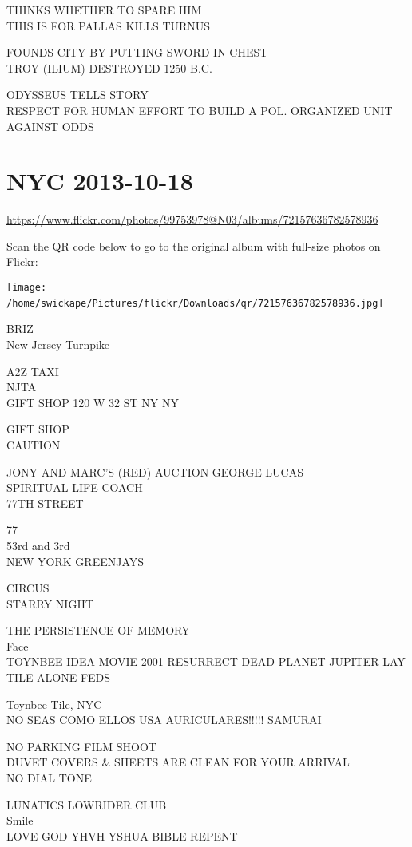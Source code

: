 \documentclass[10pt,letterpaper]{article}
\begin{document}
THINKS WHETHER TO SPARE HIM\\
THIS IS FOR PALLAS KILLS TURNUS

FOUNDS CITY BY PUTTING SWORD IN CHEST\\
TROY (ILIUM) DESTROYED 1250 B.C.

ODYSSEUS TELLS STORY\\
RESPECT FOR HUMAN EFFORT TO BUILD A POL. ORGANIZED UNIT AGAINST ODDS
\

\section*{NYC 2013-10-18}

\url{https://www.flickr.com/photos/99753978@N03/albums/72157636782578936}

Scan the QR code below to go to the original album with full-size photos on Flickr:

\texttt{[image: /home/swickape/Pictures/flickr/Downloads/qr/72157636782578936.jpg]}
\

BRIZ\\
New Jersey Turnpike

A2Z TAXI\\
NJTA\\
GIFT SHOP 120 W 32 ST NY NY

GIFT SHOP\\
CAUTION

JONY AND MARC'S (RED) AUCTION GEORGE LUCAS\\
SPIRITUAL LIFE COACH\\
77TH STREET

77\\
53rd and 3rd\\
NEW YORK GREENJAYS

CIRCUS\\
STARRY NIGHT

THE PERSISTENCE OF MEMORY\\
Face\\
TOYNBEE IDEA MOVIE 2001 RESURRECT DEAD PLANET JUPITER LAY TILE ALONE FEDS

Toynbee Tile, NYC\\
NO SEAS COMO ELLOS USA AURICULARES!!!!! SAMURAI

NO PARKING FILM SHOOT\\
DUVET COVERS \& SHEETS ARE CLEAN FOR YOUR ARRIVAL\\
NO DIAL TONE

LUNATICS LOWRIDER CLUB\\
Smile\\
LOVE GOD YHVH YSHUA BIBLE REPENT
\end{document}
